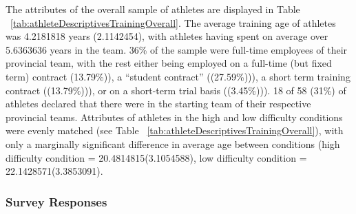 \documentclass[english]{article}\usepackage[]{graphicx}\usepackage[]{color}
\makeatletter
\newenvironment{kframe}{%
 \def\at@end@of@kframe{}%
 \ifinner\ifhmode%
  \def\at@end@of@kframe{\end{minipage}}%
  \begin{minipage}{\columnwidth}%
 \fi\fi%
 \def\FrameCommand##1{\hskip\@totalleftmargin \hskip-\fboxsep
 \colorbox{shadecolor}{##1}\hskip-\fboxsep
     \hskip-\linewidth \hskip-\@totalleftmargin \hskip\columnwidth}%
 \MakeFramed {\advance\hsize-\width
   \@totalleftmargin\z@ \linewidth\hsize
   \@setminipage}}%
 {\par\unskip\endMakeFramed%
 \at@end@of@kframe}
\newenvironment{knitrout}{}{} %
\makeatother
\begin{document}
\begin{knitrout}
\color{fgcolor}\begin{kframe}


{\ttfamily\noindent\color{warningcolor}{\#\# Warning in bind\_rows\_(x, .id): Unequal factor levels: coercing to character}}

{\ttfamily\noindent\color{warningcolor}{\#\# Warning in bind\_rows\_(x, .id): binding character and factor vector, coercing into character vector}}

{\ttfamily\noindent\color{warningcolor}{\#\# Warning in bind\_rows\_(x, .id): binding character and factor vector, coercing into character vector}}\end{kframe}
\end{knitrout}









The attributes of the overall sample of athletes are displayed in Table ~\ref{tab:athleteDescriptivesTrainingOverall}. The average training age of athletes was 4.2181818 years (2.1142454), with athletes having spent on average over 5.6363636 years in the team.
36\% of the sample were full-time employees of their provincial team, with the rest either being employed on a full-time (but fixed term) contract
(13.79\%)), a ``student contract'' ((27.59\%))), a short term training contract
((13.79\%))), or on a short-term trial basis ((3.45\%))).
 18 of 58 (31\%) of athletes declared that there were in the starting team of their respective provincial teams.
Attributes of athletes in the high and low difficulty conditions were evenly matched (see Table ~\ref{tab:athleteDescriptivesTrainingOverall}), with only a marginally significant difference in average age between conditions (high difficulty condition = 20.4814815(3.1054588), low difficulty condition = 22.1428571(3.3853091).

\subsubsection{Survey Responses}
\end{document}
